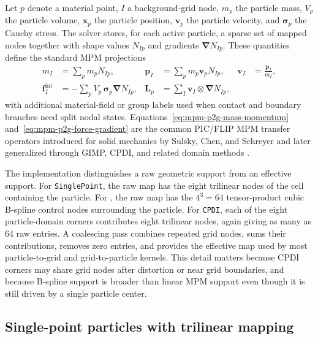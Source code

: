 Let $p$ denote a material point, $I$ a background-grid node, $m_p$ the particle mass, $V_p$ the particle volume, $\boldsymbol{x}_p$ the particle position, $\boldsymbol{v}_p$ the particle velocity, and $\boldsymbol{\sigma}_p$ the Cauchy stress.  The solver stores, for each active particle, a sparse set of mapped nodes together with shape values $N_{Ip}$ and gradients $\boldsymbol{\nabla}N_{Ip}$.  These quantities define the standard MPM projections
\begin{align}
  m_I &= \sum_p m_p N_{Ip},
  &
  \boldsymbol{p}_I &= \sum_p m_p \boldsymbol{v}_p N_{Ip},
  &
  \boldsymbol{v}_I &= \frac{\boldsymbol{p}_I}{m_I},
  \label{eq:mpm-p2g-mass-momentum}\\
  \boldsymbol{f}^{\mathrm{int}}_I
    &= -\sum_p V_p\,\boldsymbol{\sigma}_p\boldsymbol{\nabla}N_{Ip},
  &
  \boldsymbol{L}_p
    &= \sum_I \boldsymbol{v}_I\otimes \boldsymbol{\nabla}N_{Ip},
  \label{eq:mpm-p2g-force-gradient}
\end{align}
with additional material-field or group labels used when contact and boundary branches need split nodal states.  Equations~\eqref{eq:mpm-p2g-mass-momentum} and~\eqref{eq:mpm-p2g-force-gradient} are the common PIC/FLIP MPM transfer operators introduced for solid mechanics by Sulsky, Chen, and Schreyer and later generalized through GIMP, CPDI, and related domain methods \cite{sulsky1994history,sulsky1995solid,bardenhagen2004gimp,sadeghirad2011cpdi}.

The implementation distinguishes a raw geometric support from an effective support.  For \texttt{SinglePoint}, the raw map has the eight trilinear nodes of the cell containing the particle.  For , the raw map has the $4^3=64$ tensor-product cubic B-spline control nodes surrounding the particle.  For \texttt{CPDI}, each of the eight particle-domain corners contributes eight trilinear nodes, again giving as many as 64 raw entries.  A coalescing pass combines repeated grid nodes, sums their contributions, removes zero entries, and provides the effective map used by most particle-to-grid and grid-to-particle kernels.  This detail matters because CPDI corners may share grid nodes after distortion or near grid boundaries, and because B-spline support is broader than linear MPM support even though it is still driven by a single particle center.

\subsection{Single-point particles with trilinear mapping}
\label{subsec:single-point-linear}

